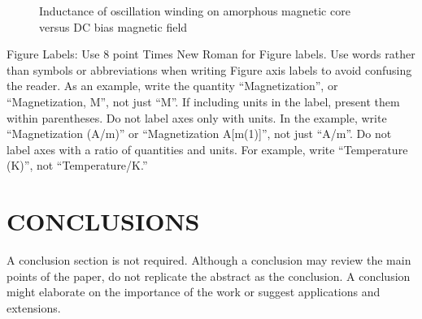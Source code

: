 \documentclass[letterpaper, 10 pt, conference]{ieeeconf}  %
\begin{document}
   \begin{figure}[thpb]
      \centering
      \caption{Inductance of oscillation winding on amorphous
       magnetic core versus DC bias magnetic field}
      \label{figurelabel}
   \end{figure}
   

Figure Labels: Use 8 point Times New Roman for Figure labels. Use words rather than symbols or abbreviations when writing Figure axis labels to avoid confusing the reader. As an example, write the quantity ``Magnetization'', or ``Magnetization, M'', not just ``M''. If including units in the label, present them within parentheses. Do not label axes only with units. In the example, write ``Magnetization (A/m)'' or ``Magnetization {A[m(1)]}'', not just ``A/m''. Do not label axes with a ratio of quantities and units. For example, write ``Temperature (K)'', not ``Temperature/K.''

\section{CONCLUSIONS}

A conclusion section is not required. Although a conclusion may review the main points of the paper, do not replicate the abstract as the conclusion. A conclusion might elaborate on the importance of the work or suggest applications and extensions. 

\addtolength{\textheight}{-12cm}   %




\end{document}
